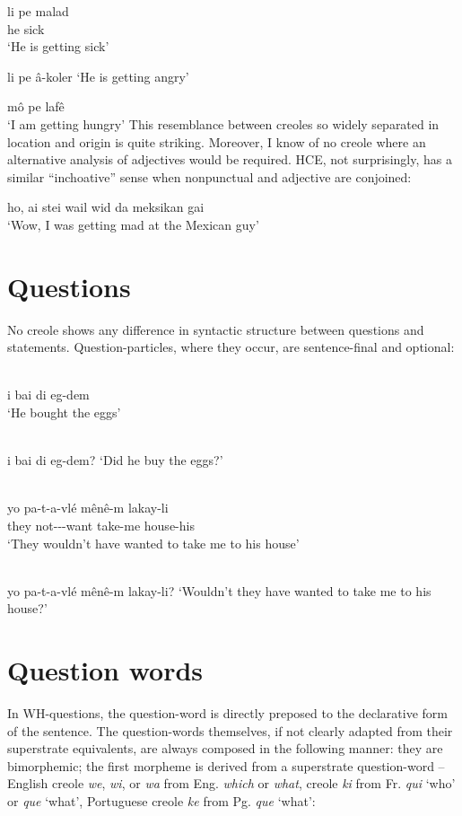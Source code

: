 \ea\label{ex:2:71}
 \gll li pe malad\\
he {\ASP} sick\\
\glt `He is getting sick'
\z

\ea\label{ex:2:72}
 li pe {\^a}-koler
\glt `He is getting angry'
\z

\ea\label{ex:2:73}
 m{\^o} pe laf{\^e}\\
\glt `I am getting hungry'
\z
This resemblance between creoles so widely separated in location and origin is quite striking. Moreover, I know of no creole where an alterna\-tive analysis of adjectives would be required. HCE, not surprisingly, has a similar ``inchoative'' sense when nonpunctual and adjective are conjoined:

\ea\label{ex:2:74}
 ho, ai stei wail wid da meksikan gai\\
\glt `Wow, I was getting mad at the Mexican guy'
\z


\section{Questions}
No creole shows any difference in syntactic structure between questions and statements. Question-particles, where they occur, are sentence-final and optional:

\ea\label{ex:2:75}
 \ili{\langGC}\\
 i bai di eg-dem\\
\glt `He bought the eggs'
\z

\ea\label{ex:2:76}
\ili{\langGC}\\
i bai di eg-dem?
\glt `Did he buy the eggs?'
\z

\ea\label{ex:2:77}
\ili{\langHC}{}{}\\
\gll yo pa-t-a-vlé m{\^e}n{\^e}-m lakay-li\\
they not-\TNS-\MOD-want take-me house-his\\
\glt `They wouldn't have wanted to take me to his house'
\z

\ea\label{ex:2:78}
\ili{\langHC}{}{}\\
yo pa-t-a-vlé m{\^e}n{\^e}-m lakay-li?
\glt `Wouldn't they have wanted to take me to his house?'
\z
\section{Question words}

In WH-questions, the question-word is directly preposed to the declarative form of the sentence. The question-words themselves, if not clearly adapted from their superstrate equivalents, are always composed in the following manner: they are bimorphemic; the first morpheme is derived from a superstrate question-word -- English creole \textit{we}, \textit{wi}, or \textit{wa} from Eng. \textit{which} or \textit{what},  creole \textit{ki} from Fr. \textit{qui} `who' or \textit{que} `what', Portuguese creole \textit{ke} from Pg. \textit{que} `what':

